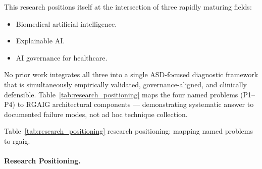 This research positions itself at the intersection of three rapidly maturing fields:
\begin{itemize}[leftmargin=*, itemsep=2pt]
    \item Biomedical artificial intelligence.
    \item Explainable AI.
    \item AI governance for healthcare.
\end{itemize}
\noindent No prior work integrates all three into a single ASD-focused diagnostic framework that is simultaneously empirically validated, governance-aligned, and clinically defensible. Table~\ref{tab:research_positioning} maps the four named problems (P1--P4) to RGAIG architectural components --- demonstrating systematic answer to documented failure modes, not ad hoc technique collection.

\noindent Table~\ref{tab:research_positioning} research positioning: mapping named problems to rgaig.

\paragraph{Research Positioning.}




